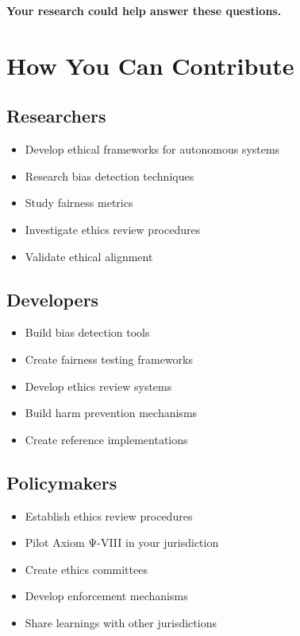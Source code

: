 \textbf{Your research could help answer these questions.}

\vspace{0.5cm}

\section{How You Can Contribute}

\subsection{Researchers}

\begin{itemize}
    \item Develop ethical frameworks for autonomous systems
    \item Research bias detection techniques
    \item Study fairness metrics
    \item Investigate ethics review procedures
    \item Validate ethical alignment
\end{itemize}

\subsection{Developers}

\begin{itemize}
    \item Build bias detection tools
    \item Create fairness testing frameworks
    \item Develop ethics review systems
    \item Build harm prevention mechanisms
    \item Create reference implementations
\end{itemize}

\subsection{Policymakers}

\begin{itemize}
    \item Establish ethics review procedures
    \item Pilot Axiom Ψ-VIII in your jurisdiction
    \item Create ethics committees
    \item Develop enforcement mechanisms
    \item Share learnings with other jurisdictions
\end{itemize}

